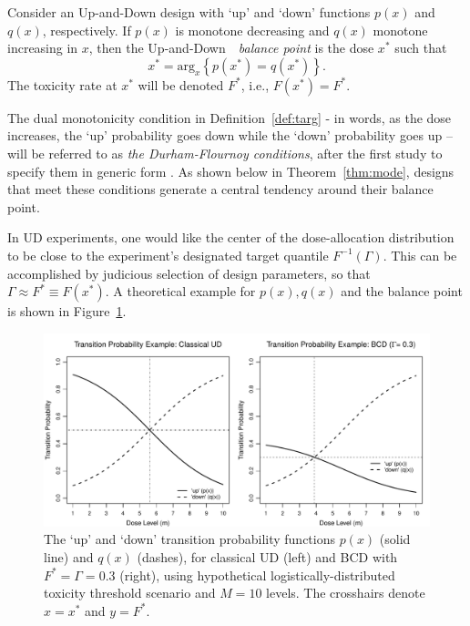 \begin{defn}\label{def:targ}  Consider an Up-and-Down design with `up' and `down' functions $p(x)$ and $q(x)$, respectively. If $p(x)$ is monotone decreasing and $q(x)$ monotone increasing in $x$,
then the Up-and-Down\ \  \emph{balance point} is the dose $x^*$ such that
\begin{equation}\label{eq:deftarget}
x^*=\mathrm{arg}_x \left\{p(x^*)=q(x^*)\right\}.
\end{equation}
The toxicity rate at $x^*$ will be denoted $F^*$, i.e., $F(x^*)=F^*$.
\end{defn}

The dual monotonicity condition in Definition~\ref{def:targ} - in words, as the dose increases, the `up' probability goes down while the `down' probability goes up --  will be referred to as \emph{the Durham-Flournoy conditions}, after the first study to specify them in generic form \citep{Durh:Flou:rand:1994,Durh:Flou:up-a:1995}. As shown below in Theorem~\ref{thm:mode}, designs that meet these conditions generate a central tendency around their balance point.

In UD experiments, one would like the center of the dose-allocation distribution to be close to the experiment's designated target quantile $F^{-1}(\Gamma)$. This can be accomplished by judicious selection of design parameters, so that  $\Gamma\approx F^*\equiv F(x^*)$.  A theoretical example for $p(x),q(x)$ and the balance point is shown in Figure~\ref{fig:pq}.

\begin{figure}
\begin{center}
\includegraphics[scale=0.55]{pqfig}
\caption{The `up' and `down' transition probability functions $p(x)$ (solid line) and $q(x)$ (dashes), for classical UD (left) and BCD with $F^*=\Gamma=0.3$ (right), using hypothetical logistically-distributed toxicity threshold scenario and $M=10$ levels. The crosshairs denote $x=x^*$ and $y=F^*$.}\label{fig:pq}
\end{center}
\end{figure}

